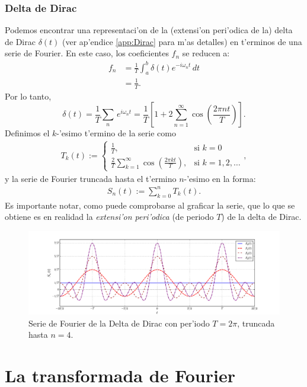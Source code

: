 \subsection{Delta de Dirac}
Podemos encontrar una representaci'on de la (extensi'on peri'odica de la) delta de Dirac $\delta(t)$ (ver ap'endice \ref{app:Dirac} para m'as detalles) en t'erminos de una serie de Fourier. En este caso, los coeficientes $f_n$ se reducen a:
\begin{align}
f_n &= \frac{1}{T}\int_a^b \delta(t) e^{-i\omega_n t}\,dt \\
&= \frac{1}{T}.
\end{align}
Por lo tanto,
\begin{equation}
\delta(t)=\frac{1}{T}\sum_n \, e^{i\omega_n t}=\frac{1}{T}\left[1+2\sum_{n=1}^\infty\cos\left(\frac{2\pi n t}{T}\right)\right].
\end{equation}
Definimos el $k$-'esimo t'ermino de la serie como 
\begin{align}
T_{k}(t):=\left\{
\begin{array}{cl}
\frac{1}{T}, &\text{si } k=0\\
\frac{2}{T}\sum_{k=1}^{\infty}\cos\left(\frac{2\pi k t}{T}\right), &\text{si } k=1,2,\ldots
\end{array} \right. ,
\end{align}
y la serie de Fourier truncada hasta el t'ermino $n$-'esimo en la forma:
\begin{align}
S_n(t):=\sum_{k=0}^n T_{k}(t).
\end{align}
Es importante notar, como puede comprobarse al graficar la serie, que lo que se obtiene es en realidad la \textit{extensi'on peri'odica} (de periodo $T$) de la delta de Dirac.
\begin{figure}[H]
\centering
\includegraphics[scale=0.4]{figs/fig-Fourier-serie-Dirac}
\caption{Serie de Fourier de la Delta de Dirac con per'iodo $T=2\pi$, truncada hasta $n=4$.}
\label{im:delta}
\end{figure}


\chapter{La transformada de Fourier}


